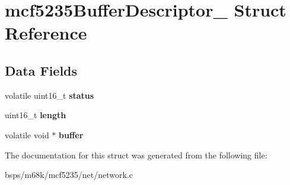 \hypertarget{structmcf5235BufferDescriptor__}{}\section{mcf5235\+Buffer\+Descriptor\+\_\+ Struct Reference}
\label{structmcf5235BufferDescriptor__}
\subsection*{Data Fields}
\begin{DoxyCompactItemize}
\item 
\mbox{\label{structmcf5235BufferDescriptor___a9dba60c94f2ae4e161fbae1b04b5642b}} 
volatile uint16\+\_\+t {\bfseries status}
\item 
\mbox{\label{structmcf5235BufferDescriptor___a4415b8ba876ec2f6cde48bb7fcb685da}} 
uint16\+\_\+t {\bfseries length}
\item 
\mbox{\label{structmcf5235BufferDescriptor___a1e014f9aba6124d439fcade632641010}} 
volatile void $\ast$ {\bfseries buffer}
\end{DoxyCompactItemize}


The documentation for this struct was generated from the following file\+:\begin{DoxyCompactItemize}
\item 
bsps/m68k/mcf5235/net/network.\+c\end{DoxyCompactItemize}
